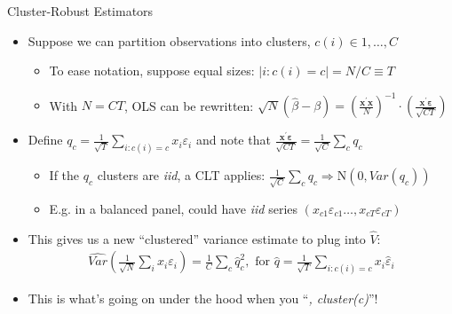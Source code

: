 \documentclass[11pt,english]{beamer}
\begin{document}
\begin{frame}{Cluster-Robust Estimators}
\begin{itemize}
\item Suppose we can partition observations into clusters, $c(i)\in{1,\dots,C}$\smallskip
\begin{itemize}
\item To ease notation, suppose equal sizes: $|i:c(i)=c|=N/C\equiv T$\smallskip\pause{}
\item With $N=CT$, OLS can be rewritten: $\sqrt{N}(\hat\beta - \beta) = \left(\frac{\mathbf{x}^\prime\mathbf{x}}{N}\right)^{-1}\cdot \left(\frac{\mathbf{x}^\prime\boldsymbol\varepsilon}{\sqrt{CT}}\right)$
\end{itemize}\medskip\pause{}

\item Define $q_c=\frac{1}{\sqrt T}\sum_{i:c(i)=c}x_i\varepsilon_i$ and note that $\frac{\mathbf{x}^\prime\boldsymbol\varepsilon}{\sqrt{CT}}=\frac{1}{\sqrt{C}}\sum_c q_c$\smallskip\pause{}
\begin{itemize}
\item If the $q_c$ clusters are \emph{iid}, a CLT applies: $\frac{1}{\sqrt{C}}\sum_c q_c\Rightarrow \mathrm{N}(0,Var(q_c))$\smallskip
\item E.g. in a balanced panel, could have \emph{iid} series $(x_{c1}\varepsilon_{c1}\dots,x_{cT}\varepsilon_{cT})$
\end{itemize}\medskip\pause{}

\item This gives us a new ``clustered'' variance estimate to plug into $\hat{V}$:
\begin{align*}
\widehat{Var}\left(\frac{1}{\sqrt{N}}\sum_i x_i\varepsilon_i\right)=\frac{1}{C}\sum_c \hat{q}_c^2,\text{ for }\hat{q}=\frac{1}{\sqrt{T}}\sum_{i:c(i)=c}x_i\hat\varepsilon_i
\end{align*}\pause{}

\item This is what's going on under the hood when you ``\emph{, cluster(c)}''!
\end{itemize}
\end{frame}
\end{document}
